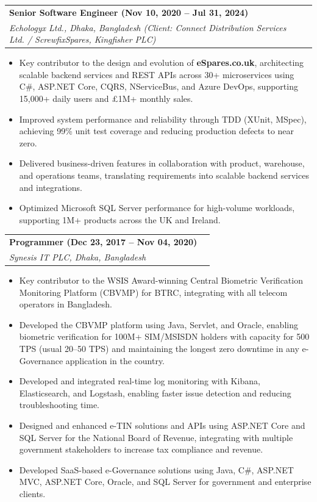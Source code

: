 ﻿\documentclass[letterpaper,10pt]{article}
\makeatletter
\newcommand{\resumeItem}[1]{\item\small{#1}}
\newcommand{\resumeSubheading}[4]{
\vspace{-1pt}\item
  \begin{tabular*}{0.97\textwidth}[t]{l@{\extracolsep{\fill}}r}
    \textbf{#1} & #2 \\
    \textit{#3} & \textit{#4} \\
  \end{tabular*}\vspace{-7pt}
}
\newcommand{\resumeSubHeadingList}{\begin{itemize}[leftmargin=0.15in, label={}]}
\newcommand{\resumeSubHeadingListEnd}{\end{itemize}}
\makeatother
\begin{document}
\resumeSubheading
  {Senior Software Engineer (Nov 10, 2020 -- Jul 31, 2024)}{}
  {Echologyx Ltd., Dhaka, Bangladesh \textit{(Client: Connect Distribution Services Ltd. / ScrewfixSpares, Kingfisher PLC)}}{}
  \resumeSubHeadingList
    \resumeItem{Key contributor to the design and evolution of \textbf{eSpares.co.uk}, architecting scalable backend services and REST APIs across 30+ microservices using C\#, ASP.NET Core, CQRS, NServiceBus, and Azure DevOps, supporting 15,000+ daily users and £1M+ monthly sales.}
    \resumeItem{Improved system performance and reliability through TDD (XUnit, MSpec), achieving 99\% unit test coverage and reducing production defects to near zero.}
    \resumeItem{Delivered business-driven features in collaboration with product, warehouse, and operations teams, translating requirements into scalable backend services and integrations.}
    \resumeItem{Optimized Microsoft SQL Server performance for high-volume workloads, supporting 1M+ products across the UK and Ireland.}
  \resumeSubHeadingListEnd




\resumeSubheading
  {Programmer (Dec 23, 2017 -- Nov 04, 2020)}{}
  {Synesis IT PLC, Dhaka, Bangladesh}{}
  \resumeSubHeadingList
    \resumeItem{Key contributor to the WSIS Award-winning Central Biometric Verification Monitoring Platform (CBVMP) for BTRC, integrating with all telecom operators in Bangladesh.}
    \resumeItem{Developed the CBVMP platform using Java, Servlet, and Oracle, enabling biometric verification for 100M+ SIM/MSISDN holders with capacity for 500 TPS (usual 20–50 TPS) and maintaining the longest zero downtime in any e-Governance application in the country.}
    \resumeItem{Developed and integrated real-time log monitoring with Kibana, Elasticsearch, and Logstash, enabling faster issue detection and reducing troubleshooting time.}
    \resumeItem{Designed and enhanced e-TIN solutions and APIs using ASP.NET Core and SQL Server for the National Board of Revenue, integrating with multiple government stakeholders to increase tax compliance and revenue.}
    \resumeItem{Developed SaaS-based e-Governance solutions using Java, C\#, ASP.NET MVC, ASP.NET Core, Oracle, and SQL Server for government and enterprise clients.}
  \resumeSubHeadingListEnd
\end{document}
